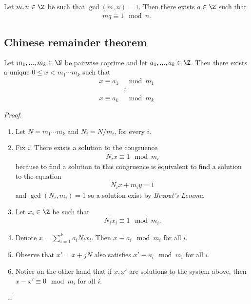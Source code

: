 \documentclass{article}
\begin{document}
\begin{lemma}[Lecture 5]
	Let $m,n\in\Z$ be such that $\gcd(m,n)=1$. Then there exists $q\in\Z$ such that 
	\begin{align*}
		mq\equiv 1\mod n.
	\end{align*}	
\end{lemma}

\subsection{Chinese remainder theorem}

\begin{theorem}
	Let $m_1,...,m_k\in\N$ be pairwise coprime and let $a_1,...,a_k\in\Z$. Then there exists a
	unique $0\leq x<m_1\cdots m_k$ such that
	\begin{align*}
		x\equiv a_1 & \mod m_1 \\
		            & \vdots   \\
		x\equiv a_k & \mod m_k
	\end{align*}
	\begin{proof}
		\begin{enumerate}
			\item Let $N=m_1\cdots m_k$ and $N_i=N/m_i$, for every $i$.
			\item Fix $i$. There exists a solution to the congruence \begin{align*}
				      N_ix\equiv 1 \mod m_i
			      \end{align*}
			      because to find a solution to this congruence is equivalent to find a solution to
			      the equation
			      \begin{align*}
				      N_ix +m_iy=1
			      \end{align*}
			      and $\gcd(N_i,m_i)=1$ so a solution exist by \emph{Bezout's Lemma}.
			\item Let $x_i\in\Z$ be such that \begin{align*}
				      N_ix_i\equiv 1 \mod m_i.
			      \end{align*}
			\item Denote $x=\sum_{i=1}^k a_iN_ix_i$. Then $x\equiv a_i \mod m_i$ for all $i$.
			\item Observe that $x'=x+jN$ also satisfies $x'\equiv a_i \mod m_i$ for all $i$.
			\item Notice on the other hand that if $x,x'$ are solutions to the system above, then
			      $x-x'\equiv 0 \mod m_i$ for all $i$.
		\end{enumerate}
	\end{proof}
\end{theorem}
\end{document}
